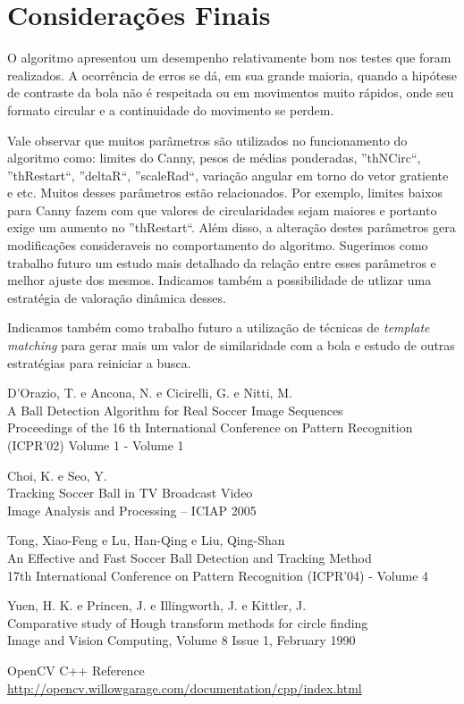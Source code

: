 \documentclass[11pt,a4paper]{article}
\begin{document}
\section{Considerações Finais}
 O algoritmo apresentou um desempenho relativamente bom nos testes que foram realizados. A ocorrência de erros se dá, em sua grande maioria, quando a hipótese de contraste da bola não é respeitada ou em movimentos muito rápidos, onde seu formato circular e a continuidade do movimento se perdem.

 Vale observar que muitos parâmetros são utilizados no funcionamento do algoritmo como: limites do Canny, pesos de médias ponderadas, ''thNCirc``, ''thRestart``, ''deltaR``, ''scaleRad``, variação angular em torno do vetor gratiente e etc. Muitos desses parâmetros estão relacionados. Por exemplo, limites baixos para Canny fazem com que valores de circularidades sejam maiores e portanto exige um aumento no ''thRestart``. Além disso, a alteração destes parâmetros gera modificações consideraveis no comportamento do algoritmo. Sugerimos como trabalho futuro um estudo mais detalhado da relação entre esses parâmetros e melhor ajuste dos mesmos. Indicamos também a possibilidade de utlizar uma estratégia de valoração dinâmica desses.

 Indicamos também como trabalho futuro a utilização de técnicas de \textit{template matching} para gerar mais um valor de similaridade com a bola e estudo de outras estratégias para reiniciar a busca.

\begin{thebibliography}{99}

 D'Orazio, T. e Ancona, N. e Cicirelli, G. e Nitti, M.\\
 A Ball Detection Algorithm for Real Soccer Image Sequences\\
 Proceedings of the 16 th International Conference on Pattern Recognition (ICPR'02) Volume 1 - Volume 1

 Choi, K. e Seo, Y.\\
 Tracking Soccer Ball in TV Broadcast Video\\
 Image Analysis and Processing – ICIAP 2005

 Tong, Xiao-Feng e Lu, Han-Qing e Liu, Qing-Shan\\
 An Effective and Fast Soccer Ball Detection and Tracking Method\\
 17th International Conference on Pattern Recognition (ICPR'04) - Volume 4

 Yuen, H. K. e Princen, J. e Illingworth, J. e Kittler, J.\\
 Comparative study of Hough transform methods for circle finding\\
 Image and Vision Computing, Volume 8 Issue 1, February 1990 

 OpenCV C++ Reference\\
 \url{http://opencv.willowgarage.com/documentation/cpp/index.html}

\end{thebibliography}
\end{document}
